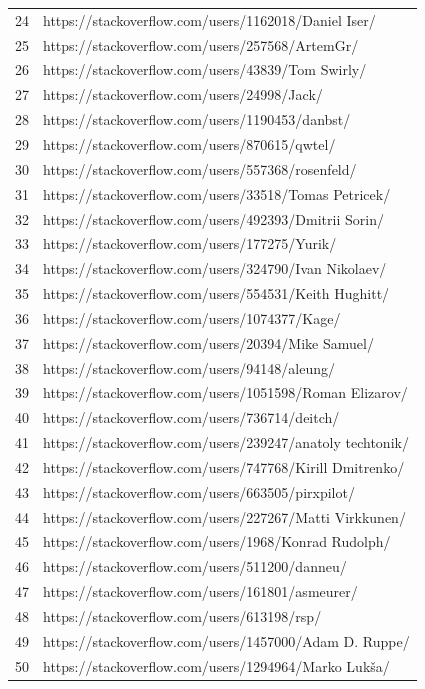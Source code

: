 \begin{center}
\begin{longtable}{|p{1.5cm}|p{12.5cm}|}
24 & https://stackoverflow.com/users/1162018/Daniel Iser/ \\
25 & https://stackoverflow.com/users/257568/ArtemGr/ \\
26 & https://stackoverflow.com/users/43839/Tom Swirly/ \\
27 & https://stackoverflow.com/users/24998/Jack/ \\
28 & https://stackoverflow.com/users/1190453/danbst/  \\
29 & https://stackoverflow.com/users/870615/qwtel/  \\
30 & https://stackoverflow.com/users/557368/rosenfeld/  \\
31 & https://stackoverflow.com/users/33518/Tomas Petricek/  \\
32 & https://stackoverflow.com/users/492393/Dmitrii Sorin/  \\
33 & https://stackoverflow.com/users/177275/Yurik/ \\
34 & https://stackoverflow.com/users/324790/Ivan Nikolaev/ \\
35 & https://stackoverflow.com/users/554531/Keith Hughitt/ \\
36 & https://stackoverflow.com/users/1074377/Kage/ \\
37 & https://stackoverflow.com/users/20394/Mike Samuel/ \\
38 & https://stackoverflow.com/users/94148/aleung/ \\
39 & https://stackoverflow.com/users/1051598/Roman  Elizarov/ \\
40 & https://stackoverflow.com/users/736714/deitch/ \\
41 & https://stackoverflow.com/users/239247/anatoly techtonik/ \\
42 & https://stackoverflow.com/users/747768/Kirill Dmitrenko/ \\
43 & https://stackoverflow.com/users/663505/pirxpilot/ \\
44 & https://stackoverflow.com/users/227267/Matti Virkkunen/ \\
45 & https://stackoverflow.com/users/1968/Konrad Rudolph/ \\
46 & https://stackoverflow.com/users/511200/danneu/ \\
47 & https://stackoverflow.com/users/161801/asmeurer/ \\
48 & https://stackoverflow.com/users/613198/rsp/ \\
49 & https://stackoverflow.com/users/1457000/Adam D. Ruppe/ \\
50 & https://stackoverflow.com/users/1294964/Marko Lukša/ \\

\end{longtable}
\end{center}
